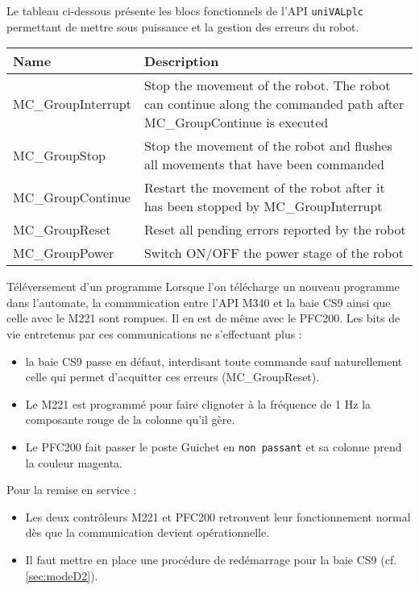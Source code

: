 Le tableau ci-dessous présente les blocs fonctionnels de l'API \texttt{uniVALplc} permettant de mettre sous puissance et la gestion des erreurs du robot.
\begin{center}
    \begin{tabular}{l|p{10cm}}
        \textbf{Name} & \textbf{Description}                                                                                                \\
        \hline\hline
        MC\_GroupInterrupt               & Stop the movement of the robot. The robot can continue along the commanded path after MC\_GroupContinue is executed \\\hline
        MC\_GroupStop                    & Stop the movement of the robot and flushes all movements that have been commanded                                   \\\hline
        MC\_GroupContinue                & Restart the movement of the robot after it has been stopped by MC\_GroupInterrupt                                   \\\hline
        MC\_GroupReset                   & Reset all pending errors reported by the robot                                                                      \\\hline
        MC\_GroupPower                   & Switch ON/OFF the power stage of the robot                                                                          \\
    \end{tabular}
\end{center}


\begin{UPSTIinfor}{Téléversement d'un programme}
    Lorsque l'on télécharge un nouveau programme dans l'automate, la communication entre l'API M340 et la baie CS9 ainsi que celle avec le M221 sont rompues. Il en est de même avec le PFC200. Les bits de vie entretenus par ces communications ne s'effectuant plus :
    \begin{itemize}
        \item la baie CS9 passe en défaut, interdisant toute commande sauf naturellement celle qui permet d'acquitter ces erreurs (MC\_GroupReset).
        \item Le M221 est programmé pour faire clignoter à la fréquence de 1 Hz la composante rouge de la colonne qu'il gère.
        \item Le PFC200 fait passer le poste Guichet en \texttt{non passant} et sa colonne prend la couleur magenta.
    \end{itemize}

    Pour la remise en service :
    \begin{itemize}
        \item Les deux contrôleurs M221 et PFC200 retrouvent leur fonctionnement normal dès que la communication devient opérationnelle.
        \item Il faut mettre en place une procédure de redémarrage pour la baie CS9 (cf. \ref{sec:modeD2}).
    \end{itemize}
\end{UPSTIinfor}


